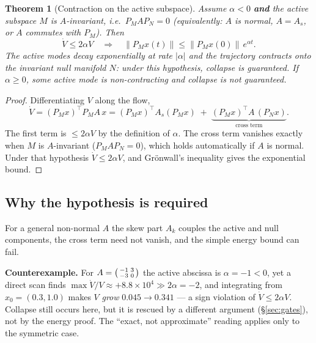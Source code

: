 \documentclass[11pt]{article}
\newtheorem{theorem}{Theorem}
\theoremstyle{definition}
\newcommand{\norm}[1]{\left\lVert#1\right\rVert}
\newcommand{\PM}{P_{\!M}}
\newcommand{\PN}{P_{\!N}}
\begin{document}
\begin{theorem}[Contraction on the active subspace]
\label{thm:contraction}
Assume $\alpha < 0$ \textbf{and} the active subspace $M$ is $A$-invariant, i.e.\
$\PM A \PN = 0$ (equivalently: $A$ is normal, $A=A_s$, or $A$ commutes with $\PM$). Then
\begin{equation}
\dot V \le 2\alpha V
\quad\Longrightarrow\quad
\norm{\PM x(t)} \le \norm{\PM x(0)}\, e^{\alpha t}.
\end{equation}
The active modes decay exponentially at rate $|\alpha|$ and the trajectory contracts onto
the invariant null manifold $N$: under this hypothesis, collapse is guaranteed. If
$\alpha \ge 0$, some active mode is non-contracting and collapse is not guaranteed.
\end{theorem}

\begin{proof}
Differentiating $V$ along the flow,
\[
\dot V = (\PM x)^{\top}\PM A\,x
= (\PM x)^{\top} A_s (\PM x)
\;+\; \underbrace{(\PM x)^{\top} A\,(\PN x)}_{\text{cross term}}.
\]
The first term is $\le 2\alpha V$ by the definition of $\alpha$. The cross term vanishes
exactly when $M$ is $A$-invariant ($\PM A \PN = 0$), which holds automatically if $A$ is
normal. Under that hypothesis $\dot V \le 2\alpha V$, and Gr\"onwall's inequality gives the
exponential bound.
\end{proof}

\subsection{Why the hypothesis is required}
\label{sec:hypothesis}
For a general non-normal $A$ the skew part $A_k$ couples the active and null components,
the cross term need not vanish, and the simple energy bound can fail.

\begin{caveatbox}
\textbf{Counterexample.} For $A=\begin{psmallmatrix}-1 & 3\\ -3 & 0\end{psmallmatrix}$ the
active abscissa is $\alpha=-1<0$, yet a direct scan finds
$\max \dot V/V \approx +8.8\times10^{4} \gg 2\alpha=-2$, and integrating from
$x_0=(0.3,1.0)$ makes $V$ \emph{grow} $0.045\to0.341$ --- a sign violation of
$\dot V\le 2\alpha V$. Collapse still occurs here, but it is rescued by a different
argument (\S\ref{sec:gates}), not by the energy proof. The ``exact, not approximate''
reading applies only to the symmetric case.
\end{caveatbox}
\end{document}
